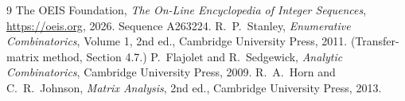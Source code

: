 \documentclass[11pt,a4paper]{article}
\theoremstyle{plain}
\theoremstyle{definition}
\begin{document}
\begin{thebibliography}{9}
 The OEIS Foundation, \emph{The On-Line Encyclopedia of Integer
Sequences}, \url{https://oeis.org}, 2026. Sequence A263224.
 R.~P.~Stanley, \emph{Enumerative Combinatorics}, Volume 1, 2nd ed.,
Cambridge University Press, 2011. (Transfer-matrix method, Section 4.7.)
 P.~Flajolet and R.~Sedgewick, \emph{Analytic Combinatorics}, Cambridge
University Press, 2009.
 R.~A.~Horn and C.~R.~Johnson, \emph{Matrix Analysis}, 2nd ed., Cambridge
University Press, 2013.
\end{thebibliography}
\end{document}
